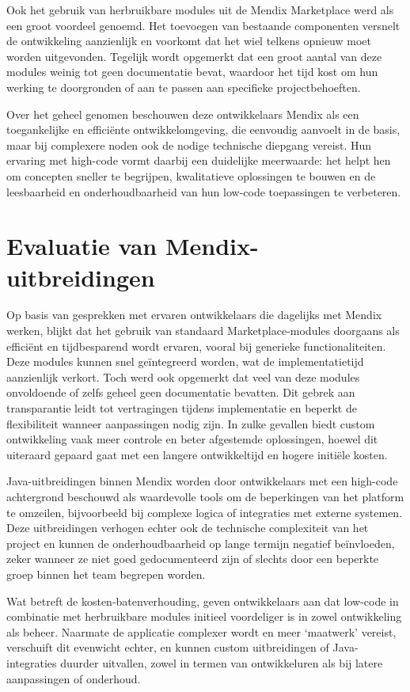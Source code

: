 Ook het gebruik van herbruikbare modules uit de Mendix Marketplace werd als een groot voordeel genoemd. Het toevoegen van bestaande componenten versnelt de ontwikkeling aanzienlijk en voorkomt dat het wiel telkens opnieuw moet worden uitgevonden. Tegelijk wordt opgemerkt dat een groot aantal van deze modules weinig tot geen documentatie bevat, waardoor het tijd kost om hun werking te doorgronden of aan te passen aan specifieke projectbehoeften. 

Over het geheel genomen beschouwen deze ontwikkelaars Mendix als een toegankelijke en efficiënte ontwikkelomgeving, die eenvoudig aanvoelt in de basis, maar bij complexere noden ook de nodige technische diepgang vereist. Hun ervaring met high-code vormt daarbij een duidelijke meerwaarde: het helpt hen om concepten sneller te begrijpen, kwalitatieve oplossingen te bouwen en de leesbaarheid en onderhoudbaarheid van hun low-code toepassingen te verbeteren.

\section{Evaluatie van Mendix-uitbreidingen}
Op basis van gesprekken met ervaren ontwikkelaars die dagelijks met Mendix werken, blijkt dat het gebruik van standaard Marketplace-modules doorgaans als efficiënt en tijdbesparend wordt ervaren, vooral bij generieke functionaliteiten. Deze modules kunnen snel geïntegreerd worden, wat de implementatietijd aanzienlijk verkort. Toch werd ook opgemerkt dat veel van deze modules onvoldoende of zelfs geheel geen documentatie bevatten. Dit gebrek aan transparantie leidt tot vertragingen tijdens implementatie en beperkt de flexibiliteit wanneer aanpassingen nodig zijn. In zulke gevallen biedt custom ontwikkeling vaak meer controle en beter afgestemde oplossingen, hoewel dit uiteraard gepaard gaat met een langere ontwikkeltijd en hogere initiële kosten.

Java-uitbreidingen binnen Mendix worden door ontwikkelaars met een high-code achtergrond beschouwd als waardevolle tools om de beperkingen van het platform te omzeilen, bijvoorbeeld bij complexe logica of integraties met externe systemen. Deze uitbreidingen verhogen echter ook de technische complexiteit van het project en kunnen de onderhoudbaarheid op lange termijn negatief beïnvloeden, zeker wanneer ze niet goed gedocumenteerd zijn of slechts door een beperkte groep binnen het team begrepen worden.

Wat betreft de kosten-batenverhouding, geven ontwikkelaars aan dat low-code in combinatie met herbruikbare modules initieel voordeliger is in zowel ontwikkeling als beheer. Naarmate de applicatie complexer wordt en meer ‘maatwerk’ vereist, verschuift dit evenwicht echter, en kunnen custom uitbreidingen of Java-integraties duurder uitvallen, zowel in termen van ontwikkeluren als bij latere aanpassingen of onderhoud.

